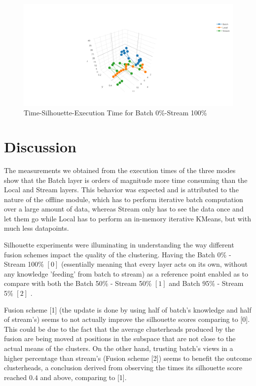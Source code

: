 \documentclass{lmproj}
\begin{document}
\bigskip

\begin{figure}[H]
	\centering	
	\includegraphics[scale=0.5]{3d/k_5_f_0_100}
	\caption{Time-Silhouette-Execution Time for Batch 0\%-Stream 100\%}
\end{figure}



\section{Discussion}
\label{evaluation}

The measurements we obtained from the execution times of the three modes show that the Batch layer is orders of magnitude more time consuming than the Local and Stream layers. This behavior was expected and is attributed to the nature of the offline module, which has to perform iterative batch computation over a large amount of data, whereas Stream only has to see the data once and let them go while Local has to perform an in-memory iterative KMeans, but with much less datapoints.

Silhouette experiments were illuminating in understanding the way different fusion schemes impact the quality of the clustering. Having the Batch 0\% - Stream 100\% $[0]$ (essentially meaning that every layer acts on its own, without any knowledge 'feeding' from batch to stream) as a reference point enabled as to compare with both the Batch 50\% - Stream 50\% $[1]$ and Batch 95\% - Stream 5\% $[2]$ .

Fusion scheme [1] (the update is done by using half of batch's knowledge and half of stream's) seems to not actually improve the silhouette scores comparing to [0]. This could be due to the fact that the average clusterheads produced by the fusion are being moved at positions in the subspace that are not close to the actual means of the clusters. On the other hand, trusting batch's views in a higher percentage than stream's  (Fusion scheme [2]) seems to benefit the outcome clusterheads, a conclusion derived from observing the times its silhouette score reached $0.4$ and above, comparing to [1].
\end{document}
